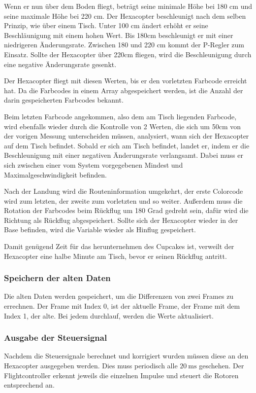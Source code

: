     Wenn er nun über dem Boden fliegt, beträgt seine minimale Höhe bei 180 cm und seine maximale Höhe bei 220 cm.
    Der Hexacopter beschleunigt nach dem selben Prinzip, wie über einem Tisch. Unter 100 cm ändert erhöht er seine Beschläunigung mit einem hohen Wert. Bis 180cm beschleunigt er mit einer niedrigeren Änderungsrate. Zwischen 180 und 220 cm kommt der P-Regler zum Einsatz. Sollte der Hexacopter über 220cm fliegen, wird die Beschleunigung durch eine negative Änderungsrate gesenkt.

    Der Hexacopter fliegt mit diesen Werten, bis er den vorletzten Farbcode erreicht hat. Da die Farbcodes in einem Array abgespeichert werden, ist die Anzahl der darin gespeicherten Farbcodes bekannt. 

    Beim letzten Farbcode angekommen, also dem am Tisch liegenden Farbcode, wird ebenfalls wieder durch die Kontrolle von 2 Werten, die sich um 50cm von der vorigen Messung unterscheiden müssen, analysiert, wann sich der Hexacopter auf dem Tisch befindet. Sobald er sich am Tisch befindet, landet er, indem er die Beschleunigung mit einer negativen Änderungsrate verlangsamt. Dabei muss er sich zwischen einer vom System vorgegebenen Mindest und Maximalgeschwindigkeit befinden. 

    Nach der Landung wird die Routeninformation umgekehrt, der erste Colorcode wird zum letzten, der zweite zum vorletzten und so weiter. Außerdem muss die Rotation der Farbcodes beim Rückflug um 180 Grad gedreht sein, dafür wird die Richtung als Rückflug abgespeichert. Sollte sich der Hexacopter wieder in der Base befinden, wird die Variable wieder als Hinflug gespeichert.

    Damit genügend Zeit für das herunternehmen des Cupcakes ist, verweilt der Hexacopter eine halbe Minute am Tisch, bevor er seinen Rückflug antritt.

    \subsubsection{Speichern der alten Daten}
    Die alten Daten werden gespeichert, um die Differenzen von zwei Frames zu errechnen. Der Frame mit Index 0, ist der aktuelle Frame, der Frame mit dem Index 1, der alte. Bei jedem durchlauf, werden die Werte aktualisiert.

    \subsubsection{Ausgabe der Steuersignal}
    Nachdem die Steuersignale berechnet und korrigiert wurden müssen diese an den Hexacopter ausgegeben werden. Dies muss periodisch alle $\SI{20}{\milli\second}$ geschehen.
    Der Flightcontroller erkennt jeweils die einzelnen Impulse und steuert die Rotoren entsprechend an.

